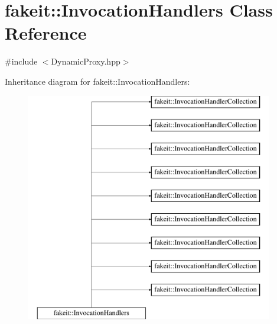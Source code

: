 \hypertarget{classfakeit_1_1InvocationHandlers}{}\section{fakeit\+::Invocation\+Handlers Class Reference}
\label{classfakeit_1_1InvocationHandlers}


{\ttfamily \#include $<$Dynamic\+Proxy.\+hpp$>$}

Inheritance diagram for fakeit\+::Invocation\+Handlers\+:\begin{figure}[H]
\begin{center}
\leavevmode
\includegraphics[height=10.000000cm]{classfakeit_1_1InvocationHandlers}
\end{center}
\end{figure}
